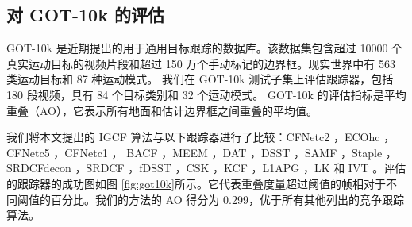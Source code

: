 \subsection{对 GOT-10k 的评估}
GOT-10k \cite{GOT-10k} 是近期提出的用于通用目标跟踪的数据库。该数据集包含超过 10000 个真实运动目标的视频片段和超过 150 万个手动标记的边界框。现实世界中有 563 类运动目标和 87 种运动模式。
我们在 GOT-10k 测试子集上评估跟踪器，包括 180 段视频，具有 84 个目标类别和 32 个运动模式。
GOT-10k 的评估指标是平均重叠（AO），它表示所有地面和估计边界框之间重叠的平均值。

我们将本文提出的 IGCF 算法与以下跟踪器进行了比较：CFNetc2 \cite{Valmadre2017EndtoEndRL}，ECOhc \cite{Danelljan2017ECOEC}，CFNetc5 \cite{Valmadre2017EndtoEndRL}，CFNetc1 \cite{Valmadre2017EndtoEndRL}， BACF \cite{Galoogahi2017LearningBC}，MEEM \cite{Zhang2014MEEMRT}，DAT \cite{Possegger2015InDO}，DSST \cite{Danelljan2014AccurateSE}，SAMF \cite{Li2014ASA}，Staple \cite{Bertinetto2016StapleC}，SRDCFdecon \cite{Danelljan2016AdaptiveDO}，SRDCF \cite{Danelljan2015LearningSR}，fDSST \cite{Danelljan2017DiscriminativeSS}，CSK \cite{Henriques2012ExploitingTC}，KCF \cite{henriques2014high-speed}，L1APG \cite{Bao2012RealTR}，LK \cite{Shi1994GoodFT} 和 IVT \cite{Ross2007IncrementalLF}。评估的跟踪器的成功图如图 \ref{fig:got10k}所示。它代表重叠度量超过阈值的帧相对于不同阈值的百分比。我们的方法的 AO 得分为 0.299，优于所有其他列出的竞争跟踪算法。

